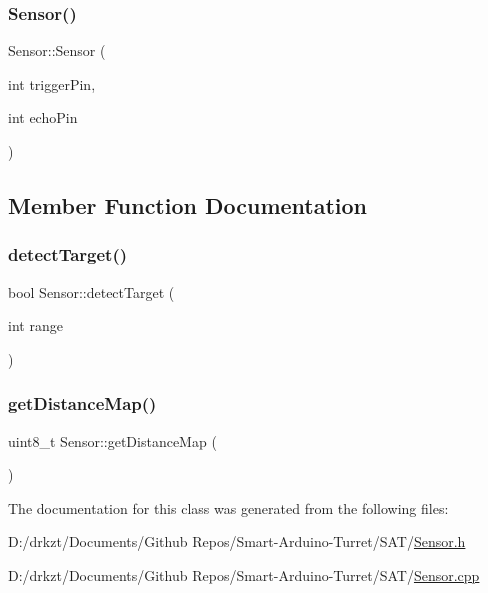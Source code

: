 \mbox{\label{class_sensor_a3f736371574f64dbc9e42eae0c2f6ff6}} 
\subsubsection{\texorpdfstring{Sensor()}{Sensor()}\hspace{0.1cm}{\footnotesize\ttfamily [3/3]}}
{\footnotesize\ttfamily Sensor\+::\+Sensor (\begin{DoxyParamCaption}\item[{int}]{trigger\+Pin,  }\item[{int}]{echo\+Pin }\end{DoxyParamCaption})}



\subsection{Member Function Documentation}
\mbox{\label{class_sensor_a30bad6b427addc330c4ec3136d24f6e8}} 
\subsubsection{\texorpdfstring{detect\+Target()}{detectTarget()}}
{\footnotesize\ttfamily bool Sensor\+::detect\+Target (\begin{DoxyParamCaption}\item[{int}]{range }\end{DoxyParamCaption})}

\mbox{\label{class_sensor_abb752f4a88eda6d4fd34f74cce1b82dc}} 
\subsubsection{\texorpdfstring{get\+Distance\+Map()}{getDistanceMap()}}
{\footnotesize\ttfamily uint8\+\_\+t Sensor\+::get\+Distance\+Map (\begin{DoxyParamCaption}{ }\end{DoxyParamCaption})}



The documentation for this class was generated from the following files\+:\begin{DoxyCompactItemize}
\item 
D\+:/drkzt/\+Documents/\+Github Repos/\+Smart-\/\+Arduino-\/\+Turret/\+S\+A\+T/\hyperlink{_sensor_8h}{Sensor.\+h}\item 
D\+:/drkzt/\+Documents/\+Github Repos/\+Smart-\/\+Arduino-\/\+Turret/\+S\+A\+T/\hyperlink{_sensor_8cpp}{Sensor.\+cpp}\end{DoxyCompactItemize}

